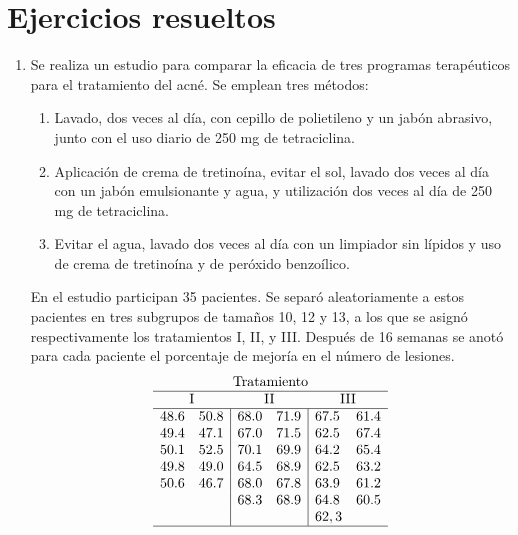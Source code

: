 \section{Ejercicios resueltos}
\begin{enumerate}[leftmargin=*]
\item Se realiza un estudio para comparar la eficacia de tres programas terapéuticos para el tratamiento del acné. Se emplean tres métodos:

\begin{enumerate}
\item Lavado, dos veces al día, con cepillo de polietileno y un jabón abrasivo, junto con el uso diario de 250 mg de tetraciclina.

\item Aplicación de crema de tretinoína, evitar el sol, lavado dos veces al día con un jabón emulsionante y agua, y utilización dos veces al día de 250 mg de tetraciclina.

\item Evitar el agua, lavado dos veces al día con un limpiador sin lípidos y uso de crema de tretinoína y de peróxido benzoílico.

\end{enumerate}
En el estudio participan 35 pacientes. 
Se separó aleatoriamente a estos pacientes en tres subgrupos de tamaños 10, 12 y 13, a los que se asignó respectivamente los tratamientos I, II, y III.
Después de 16 semanas se anotó para cada paciente el porcentaje de mejoría en el número de lesiones.
\[
\begin{array}{ll|ll|ll}
\multicolumn{6}{c}{\textrm{Tratamiento}} \\
\hline
\multicolumn{2}{c}{\textrm{I}} & \multicolumn{2}{c}{\textrm{II}} & \multicolumn{2}{c}{\textrm{III}} \\
\hline
48.6 & 50.8 & 68.0 & 71.9 & 67.5 & 61.4 \\
49.4 & 47.1 & 67.0 & 71.5 & 62.5 & 67.4 \\
50.1 & 52.5 & 70.1 & 69.9 & 64.2 & 65.4 \\
49.8 & 49.0 & 64.5 & 68.9 & 62.5 & 63.2 \\
50.6 & 46.7 & 68.0 & 67.8 & 63.9 & 61.2 \\
     &      & 68.3 & 68.9 & 64.8 & 60.5 \\
     &      &      &      & 62,3 &      \\
\hline
\end{array}
\]
\begin{enumerate}


\end{enumerate}
\end{enumerate}
